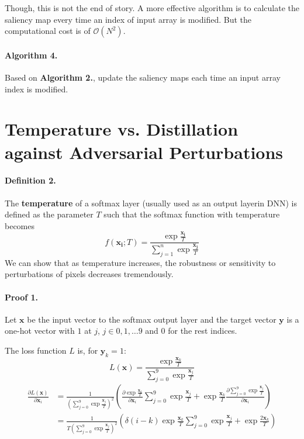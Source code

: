 \documentclass{article}
\begin{document}
Though, this is not the end of story. A more effective algorithm is to calculate the saliency map every time an index of input array is modified. But the computational cost is of $\mathcal{O}(N^2)$.
\paragraph{Algorithm 4.}
Based on \textbf{Algorithm 2.}, update the saliency maps each time an input array index is modified.
\section{Temperature vs. Distillation against Adversarial Perturbations}

\paragraph{Definition 2.}
The \textbf{temperature} of a softmax layer (usually used as an output layerin DNN) is defined as the parameter $T$ such that the softmax function with temperature becomes 
\begin{equation}
	f(\mathbf{x_i};T)=\frac{\exp{\frac{\mathbf{x_i}}{T}}}{\sum_{j=1}^n 
	\exp{\frac{\mathbf{x_j}}{T}}}
\end{equation}
We can show that as temperature increases, the robustness or sensitivity to perturbations of pixels decreases tremendously.
\paragraph{Proof 1.}
Let $\mathbf{x}$ be the input vector to the softmax output layer and the target vector $\mathbf{y}$ is a one-hot vector with $1$ at $j$, $j\in{0,1,\dots 9}$ and $0$ for the rest indices.

The loss function $L$ is, for $\mathbf{y}_k=1$:
\begin{equation}
	L(\mathbf{x}) = \frac{\exp{\frac{\mathbf{x}_k}{T}}}{\sum_{j=0}^9 \exp{\frac{\mathbf{x}_j}{T}}}
\end{equation}
\begin{align}
	\frac{\partial L(\mathbf{x})}{\partial \mathbf{x}_i} &= 
	\frac{1}{(\sum_{j=0}^9 \exp{\frac{\mathbf{x}_j}{T}})^2}
	(
	\frac{\partial \exp{\frac{\mathbf{x}_k}{T}}}{\partial \mathbf{x}_i}
	\sum_{j=0}^9 \exp{\frac{\mathbf{x}_j}{T}} 
	+ \exp{\frac{\mathbf{x}_k}{T}}
	\frac{\partial \sum_{j=0}^9 \exp{\frac{\mathbf{x}_j}{T}}}{\partial \mathbf{x}_i}
	)\\
	&=
	\frac{1}{T(\sum_{j=0}^9 \exp{\frac{\mathbf{x}_j}{T}})^2} (
	\delta (i-k) \exp{\frac{\mathbf{x}_k}{T}}
	\sum_{j=0}^9 \exp{\frac{\mathbf{x}_j}{T}}+
	\exp{\frac{2\mathbf{x}_k}{T}} )
\end{align}
\end{document}
